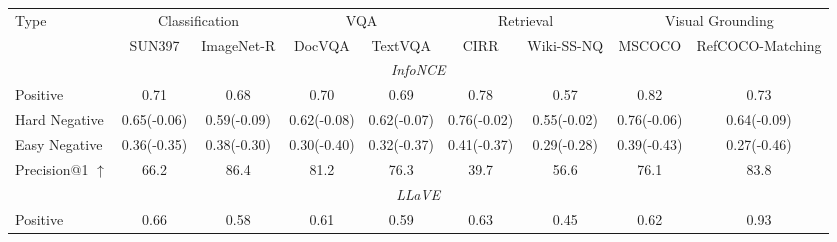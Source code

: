\documentclass[11pt]{article}
\begin{document}
\begin{table}[]
\centering
\setlength\tabcolsep{6.5pt}%
\renewcommand\arraystretch{1.2}
\small
\fontsize{7pt}{7pt}\selectfont
\begin{tabular}{lcccccccc}
\toprule
\multicolumn{1}{l|}{\multirow{2}{*}{Type}} & \multicolumn{2}{c|}{Classification}            & \multicolumn{2}{c|}{VQA}                        & \multicolumn{2}{c|}{Retrieval}                 & \multicolumn{2}{c}{Visual Grounding} \\
\multicolumn{1}{l|}{}                      & SUN397      & \multicolumn{1}{c|}{ImageNet-R}  & DocVQA       & \multicolumn{1}{c|}{TextVQA}     & CIRR        & \multicolumn{1}{c|}{Wiki-SS-NQ}  & MSCOCO            & RefCOCO-Matching          \\ \midrule
\multicolumn{9}{c}{\textit{InfoNCE}}                                                                                                                                                                                                           \\ \midrule
\multicolumn{1}{l|}{Positive}              & 0.71        & \multicolumn{1}{c|}{0.68}        & 0.70          & \multicolumn{1}{c|}{0.69}        & 0.78        & \multicolumn{1}{c|}{0.57}        & 0.82              & 0.73             \\
\multicolumn{1}{l|}{Hard Negative}         & 0.65(-0.06) & \multicolumn{1}{c|}{0.59(-0.09)} & 0.62(-0.08)  & \multicolumn{1}{c|}{0.62(-0.07)} & 0.76(-0.02) & \multicolumn{1}{c|}{0.55(-0.02)} & 0.76(-0.06)       & 0.64(-0.09)      \\
\multicolumn{1}{l|}{Easy Negative}         & 0.36(-0.35) & \multicolumn{1}{c|}{0.38(-0.30)} & 0.30(-0.40)   & \multicolumn{1}{c|}{0.32(-0.37)} & 0.41(-0.37) & \multicolumn{1}{c|}{0.29(-0.28)} & 0.39(-0.43)       & 0.27(-0.46)      \\
\midrule
\multicolumn{1}{l|}{Precision@1 $\uparrow$}               & 66.2       & \multicolumn{1}{c|}{86.4}       & 81.2        & \multicolumn{1}{c|}{76.3}       & 39.7       & \multicolumn{1}{c|}{56.6}       & 76.1             & 83.8            \\ \midrule
\multicolumn{9}{c}{\textit{LLaVE}}                                                                                                                                                                                                              \\ \midrule
\multicolumn{1}{l|}{Positive}              & 0.66        & \multicolumn{1}{c|}{0.58}        & 0.61         & \multicolumn{1}{c|}{0.59}        & 0.63        & \multicolumn{1}{c|}{0.45}        & 0.62              & 0.93             \\

\end{tabular}
\end{table}
\end{document}
